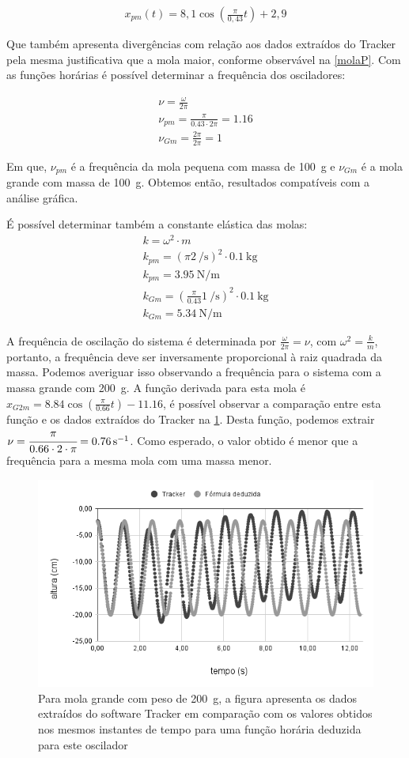 \begin{align*}
x_{pm}(t) = 8,1 \cos(\frac{\pi}{0,43}t) + 2,9
\end{align*}

    Que também apresenta divergências com relação aos dados extraídos do Tracker pela mesma justificativa que a mola maior, conforme observável na \cref{molaP}.
    Com as funções horárias é possível determinar a frequência dos osciladores:

\begin{align*}
    \nu = \frac{\omega}{2\pi}\\
    \nu_{pm} = \frac{\pi}{\num{0,43} \cdot 2\pi} = \num{1,16}\\ 
    \nu_{Gm} = \frac{2\pi}{2\pi} = 1
\end{align*}

Em que, \(\nu_{pm}\) é a frequência da mola pequena com massa de \qty{100}{g} e \(\nu_{Gm}\) é a mola grande com massa de \qty{100}{g}. Obtemos então, resultados compatíveis com a análise gráfica.

É possível determinar também a constante elástica das molas:
\begin{align*}
   k = \omega^2 \cdot m\\
   k_{pm} = {(\pi\qty{2}{\per\second})}^2 \cdot \qty{0.1}{\kilo\gram}\\
   k_{pm} = \qty{3,95}{\N\per\meter}\\
   k_{Gm} = {(\frac{\pi}{0.43}\qty{1}{\per\second})}^2 \cdot \qty{0.1}{\kg}\\
   k_{Gm} = \qty{5.34}{\N\per\meter} 
\end{align*}

A frequência de oscilação do sistema é determinada por \(\frac{\omega}{2 \pi}  = \nu\), com \(\omega^2 = \frac{k}{m}\), portanto, a frequência deve ser inversamente proporcional à raiz quadrada da massa. Podemos averiguar isso observando a frequência para o sistema com a massa grande com \qty{200}{\g}. A função derivada para esta mola é \(x_{G2m} = 8.84\cos(\frac{\pi}{0.66}t) -11.16\), é possível observar a comparação entre esta função e os dados extraídos do Tracker na \cref{molaG2m}. Desta função, podemos extrair \(\nu = \cfrac{\pi}{0.66 \cdot 2 \cdot \pi} = \qty{0.76}{\per\second}\). Como esperado, o valor obtido é menor que a frequência para a mesma mola com uma massa menor.   

\begin{figure}[h]
    \centering
    \includegraphics[width=.5\linewidth]{fig/molaG2m}
    \caption{Para mola grande com peso de \qty{200}{\g}, a figura apresenta os dados extraídos do software Tracker em comparação com os valores obtidos nos mesmos instantes de tempo para uma função horária deduzida para este oscilador}
    \label{molaG2m}
\end{figure}

